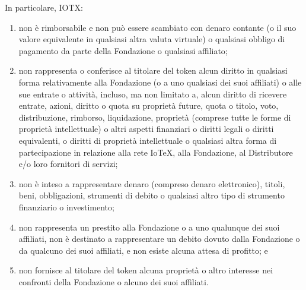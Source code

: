 In particolare, IOTX:

\begin{enumerate}[label=(\alph*)]
    \item non è rimborsabile e non può essere scambiato con denaro contante (o il suo valore equivalente in qualsiasi altra valuta virtuale) o qualsiasi obbligo di pagamento da parte della Fondazione o qualsiasi affiliato;

    \item non rappresenta o conferisce al titolare del token alcun diritto in qualsiasi forma relativamente alla Fondazione (o a uno qualsiasi dei suoi affiliati) o alle sue entrate o attività, incluso, ma non limitato a, alcun diritto di ricevere entrate, azioni, diritto o quota su proprietà future, quota o titolo, voto, distribuzione, rimborso, liquidazione, proprietà (comprese tutte le forme di proprietà intellettuale) o altri aspetti finanziari
    o diritti legali o diritti equivalenti, o diritti di proprietà intellettuale o qualsiasi altra forma di partecipazione in relazione alla rete IoTeX, alla Fondazione, al Distributore e/o loro fornitori di servizi;

    \item non è inteso a rappresentare denaro (compreso denaro elettronico), titoli, beni, obbligazioni, strumenti di debito o qualsiasi altro tipo di strumento finanziario o investimento;

    \item non rappresenta un prestito alla Fondazione o a uno qualunque dei suoi affiliati, non è destinato a rappresentare un debito dovuto dalla Fondazione o da qualcuno dei suoi affiliati, e non esiste alcuna attesa di profitto; e

    \item non fornisce al titolare del token alcuna proprietà o altro interesse nei confronti della Fondazione o alcuno dei suoi affiliati.
\end{enumerate}
